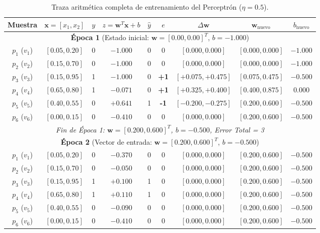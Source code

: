 \documentclass[11pt,letterpaper]{article}
\begin{document}
\begin{table}[H]
\centering
\small
\caption{Traza aritmética completa de entrenamiento del Perceptrón ($\eta = 0.5$).}
\label{tab:traza_epocas}
\begin{tabular}{ccccccccc}
\toprule
\textbf{Muestra} & $\mathbf{x} = [x_1, x_2]$ & $y$ & $z = \mathbf{w}^T\mathbf{x} + b$ & $\hat{y}$ & $e$ & $\Delta \mathbf{w}$ & $\mathbf{w}_{\text{nuevo}}$ & $b_{\text{nuevo}}$ \\
\midrule
\multicolumn{9}{c}{\textbf{Época 1} (Estado inicial: $\mathbf{w} = [0.00, 0.00]^T$, $b = -1.000$)} \\
\midrule
$p_1$ ($v_1$) & $[0.05, 0.20]$ & 0 & $-1.000$ & 0 & 0 & $[0.000, 0.000]$ & $[0.000, 0.000]$ & $-1.000$ \\
$p_2$ ($v_2$) & $[0.15, 0.70]$ & 0 & $-1.000$ & 0 & 0 & $[0.000, 0.000]$ & $[0.000, 0.000]$ & $-1.000$ \\
$p_3$ ($v_3$) & $[0.15, 0.95]$ & 1 & $-1.000$ & 0 & \textbf{+1} & $[+0.075, +0.475]$ & $[0.075, 0.475]$ & $-0.500$ \\
$p_4$ ($v_4$) & $[0.65, 0.80]$ & 1 & $-0.071$ & 0 & \textbf{+1} & $[+0.325, +0.400]$ & $[0.400, 0.875]$ & $0.000$ \\
$p_5$ ($v_5$) & $[0.40, 0.55]$ & 0 & $+0.641$ & 1 & \textbf{-1} & $[-0.200, -0.275]$ & $[0.200, 0.600]$ & $-0.500$ \\
$p_6$ ($v_6$) & $[0.00, 0.15]$ & 0 & $-0.410$ & 0 & 0 & $[0.000, 0.000]$ & $[0.200, 0.600]$ & $-0.500$ \\
\midrule
\multicolumn{9}{c}{\textit{Fin de Época 1: $\mathbf{w} = [0.200, 0.600]^T$, $b = -0.500$, Error Total = 3}} \\
\midrule
\multicolumn{9}{c}{\textbf{Época 2} (Vector de entrada: $\mathbf{w} = [0.200, 0.600]^T$, $b = -0.500$)} \\
\midrule
$p_1$ ($v_1$) & $[0.05, 0.20]$ & 0 & $-0.370$ & 0 & 0 & $[0.000, 0.000]$ & $[0.200, 0.600]$ & $-0.500$ \\
$p_2$ ($v_2$) & $[0.15, 0.70]$ & 0 & $-0.050$ & 0 & 0 & $[0.000, 0.000]$ & $[0.200, 0.600]$ & $-0.500$ \\
$p_3$ ($v_3$) & $[0.15, 0.95]$ & 1 & $+0.100$ & 1 & 0 & $[0.000, 0.000]$ & $[0.200, 0.600]$ & $-0.500$ \\
$p_4$ ($v_4$) & $[0.65, 0.80]$ & 1 & $+0.110$ & 1 & 0 & $[0.000, 0.000]$ & $[0.200, 0.600]$ & $-0.500$ \\
$p_5$ ($v_5$) & $[0.40, 0.55]$ & 0 & $-0.090$ & 0 & 0 & $[0.000, 0.000]$ & $[0.200, 0.600]$ & $-0.500$ \\
$p_6$ ($v_6$) & $[0.00, 0.15]$ & 0 & $-0.410$ & 0 & 0 & $[0.000, 0.000]$ & $[0.200, 0.600]$ & $-0.500$ \\
\bottomrule
\end{tabular}
\end{table}
\end{document}
